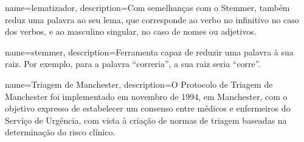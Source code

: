  
{
	name=lematizador,
	description={Com semelhanças com o Stemmer, também reduz uma palavra ao seu lema, que corresponde ao verbo no infinitivo no caso dos verbos, e ao masculino singular, no caso de nomes ou adjetivos. }
}
 
{
	name=stemmer,
	description={Ferramenta capaz de reduzir uma palavra à sua raiz. Por exemplo, para a palavra ``correria'', a sua raiz seria ``corre''. }
}
 
{
	name=Triagem de Manchester,
	description={O Protocolo de Triagem de Manchester foi implementado em novembro de 1994, em Manchester, com o objetivo expresso de estabelecer um consenso entre médicos e enfermeiros do Serviço de Urgência, com vista à criação de normas de triagem baseadas na determinação do risco clínico. \citep{grupoportuguestriagem}}
}
 